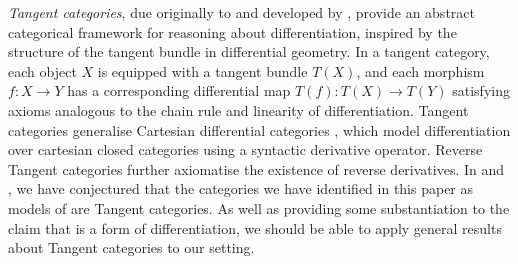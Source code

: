 \emph{Tangent categories}, due originally to \citet{rosický84} and developed by \citet{cockett14,cockett18},
provide an abstract categorical framework for reasoning about differentiation, inspired by the structure of
the tangent bundle in differential geometry. In a tangent category, each object $X$ is equipped with a tangent
bundle $T(X)$, and each morphism $f: X \to Y$ has a corresponding differential map $T(f): T(X) \to T(Y)$
satisfying axioms analogous to the chain rule and linearity of differentiation. Tangent categories generalise
Cartesian differential categories \cite{cdcs}, which model differentiation over cartesian closed categories
using a syntactic derivative operator. Reverse Tangent categories \cite{reverse-tangents} further axiomatise
the existence of reverse derivatives. In  and , we have
conjectured that the categories we have identified in this paper as models of \GPS are Tangent categories. As
well as providing some substantiation to the claim that \GPS is a form of differentiation, we should be able
to apply general results about Tangent categories to our setting. %




